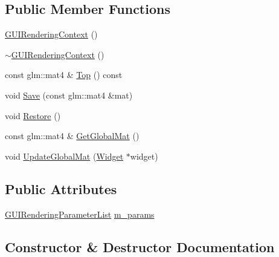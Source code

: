 \subsection*{Public Member Functions}
\begin{DoxyCompactItemize}
\item 
\mbox{\hyperlink{classec__gui_1_1_g_u_i_rendering_context_a093cd9f54cdc2fc2d54c8a3d09b7f7d5}{G\+U\+I\+Rendering\+Context}} ()
\item 
\mbox{\hyperlink{classec__gui_1_1_g_u_i_rendering_context_a07564cf7658d84fe49e7b0686141cb20}{$\sim$\+G\+U\+I\+Rendering\+Context}} ()
\item 
const glm\+::mat4 \& \mbox{\hyperlink{classec__gui_1_1_g_u_i_rendering_context_a0fcf40b5a0421f118e8e82278b4e2955}{Top}} () const
\item 
void \mbox{\hyperlink{classec__gui_1_1_g_u_i_rendering_context_ae63a4e7d516c071af0aba9487b7423a2}{Save}} (const glm\+::mat4 \&mat)
\item 
void \mbox{\hyperlink{classec__gui_1_1_g_u_i_rendering_context_a39e743f8ab91e009f26ac70c4e8096e7}{Restore}} ()
\item 
const glm\+::mat4 \& \mbox{\hyperlink{classec__gui_1_1_g_u_i_rendering_context_a6af96b4bea518fbe3d470b35bdffb814}{Get\+Global\+Mat}} ()
\item 
void \mbox{\hyperlink{classec__gui_1_1_g_u_i_rendering_context_a508e81b956037b50522eeb930ab3cd60}{Update\+Global\+Mat}} (\mbox{\hyperlink{classec__gui_1_1_widget}{Widget}} $\ast$widget)
\end{DoxyCompactItemize}
\subsection*{Public Attributes}
\begin{DoxyCompactItemize}
\item 
\mbox{\hyperlink{structec__gui_1_1_g_u_i_rendering_parameter_list}{G\+U\+I\+Rendering\+Parameter\+List}} \mbox{\hyperlink{classec__gui_1_1_g_u_i_rendering_context_a04be470f42b7b4a3fa333ea15ea23a86}{m\+\_\+params}}
\end{DoxyCompactItemize}


\subsection{Constructor \& Destructor Documentation}
\mbox{\label{classec__gui_1_1_g_u_i_rendering_context_a093cd9f54cdc2fc2d54c8a3d09b7f7d5}} 
